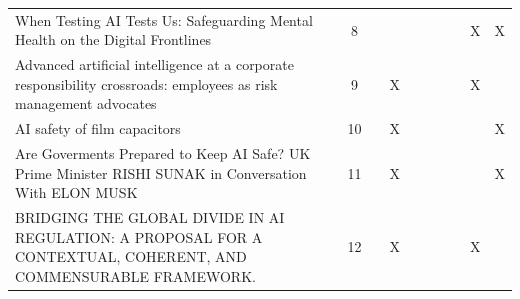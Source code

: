 \begin{landscape}
\begin{longtable}{|p{17cm}|c|c|c|c|c|c|c|c|c|}
		When Testing AI Tests Us: Safeguarding Mental Health on the Digital Frontlines                                                                          & 8           &                                    &                                                           &                                                       &                                                            &                                           &                                              & X                                                  & X                                  \\
		Advanced artificial intelligence at a corporate responsibility crossroads: employees as risk management advocates                                       & 9           &                                    & X                                                         &                                                       &                                                            &                                           &                                              & X                                                  &                                    \\
		AI safety of film capacitors                                                                                                                            & 10          &                                    & X                                                         &                                                       &                                                            &                                           &                                              &                                                    & X                                  \\
		Are Goverments Prepared to Keep AI Safe? UK Prime Minister RISHI SUNAK in Conversation With ELON MUSK                                                   & 11          &                                    & X                                                         &                                                       &                                                            &                                           &                                              &                                                    & X                                  \\
		BRIDGING THE GLOBAL DIVIDE IN AI REGULATION: A PROPOSAL FOR A CONTEXTUAL, COHERENT, AND COMMENSURABLE FRAMEWORK.                                        & 12          &                                    & X                                                         &                                                       &                                                            &                                           &                                              & X                                                  &                                    \\

\end{longtable}
\end{landscape}
